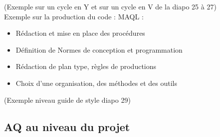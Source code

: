 (Exemple sur un cycle en Y et sur un cycle en V de la diapo 25 à 27)\\

Exemple sur la production du code : MAQL :
\begin{itemize}
\item Rédaction et mise en place des procédures
\item Définition de Normes de conception et programmation
\item Rédaction de plan type, règles de productions
\item Choix d’une organisation, des méthodes et des outils
\end{itemize}

(Exemple niveau guide de style diapo 29)

	\subsection{AQ au niveau du projet}

